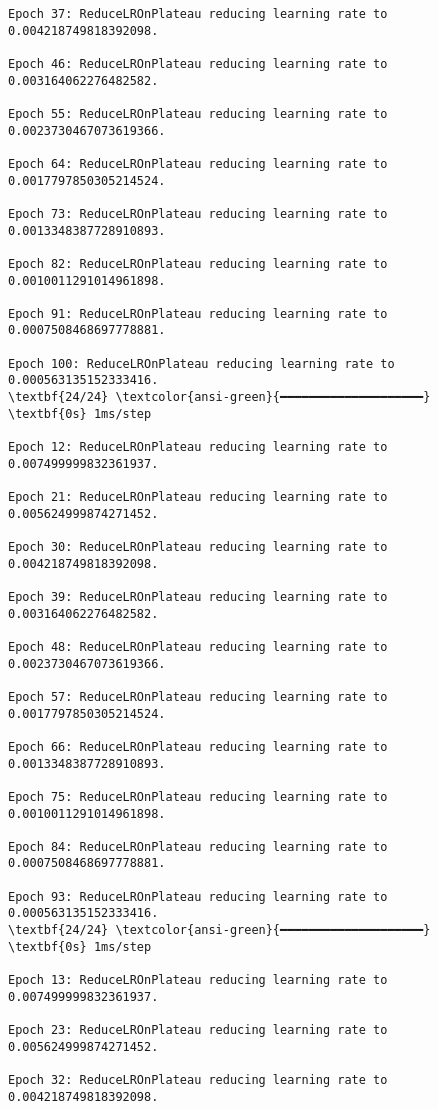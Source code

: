 \documentclass[11pt]{article}
\begin{document}
\begin{Verbatim}[commandchars=\\\{\}]
Epoch 37: ReduceLROnPlateau reducing learning rate to 0.004218749818392098.

Epoch 46: ReduceLROnPlateau reducing learning rate to 0.003164062276482582.

Epoch 55: ReduceLROnPlateau reducing learning rate to 0.0023730467073619366.

Epoch 64: ReduceLROnPlateau reducing learning rate to 0.0017797850305214524.

Epoch 73: ReduceLROnPlateau reducing learning rate to 0.0013348387728910893.

Epoch 82: ReduceLROnPlateau reducing learning rate to 0.0010011291014961898.

Epoch 91: ReduceLROnPlateau reducing learning rate to 0.0007508468697778881.

Epoch 100: ReduceLROnPlateau reducing learning rate to 0.000563135152333416.
\textbf{24/24} \textcolor{ansi-green}{━━━━━━━━━━━━━━━━━━━━} \textbf{0s} 1ms/step

Epoch 12: ReduceLROnPlateau reducing learning rate to 0.007499999832361937.

Epoch 21: ReduceLROnPlateau reducing learning rate to 0.005624999874271452.

Epoch 30: ReduceLROnPlateau reducing learning rate to 0.004218749818392098.

Epoch 39: ReduceLROnPlateau reducing learning rate to 0.003164062276482582.

Epoch 48: ReduceLROnPlateau reducing learning rate to 0.0023730467073619366.

Epoch 57: ReduceLROnPlateau reducing learning rate to 0.0017797850305214524.

Epoch 66: ReduceLROnPlateau reducing learning rate to 0.0013348387728910893.

Epoch 75: ReduceLROnPlateau reducing learning rate to 0.0010011291014961898.

Epoch 84: ReduceLROnPlateau reducing learning rate to 0.0007508468697778881.

Epoch 93: ReduceLROnPlateau reducing learning rate to 0.000563135152333416.
\textbf{24/24} \textcolor{ansi-green}{━━━━━━━━━━━━━━━━━━━━} \textbf{0s} 1ms/step

Epoch 13: ReduceLROnPlateau reducing learning rate to 0.007499999832361937.

Epoch 23: ReduceLROnPlateau reducing learning rate to 0.005624999874271452.

Epoch 32: ReduceLROnPlateau reducing learning rate to 0.004218749818392098.


\end{Verbatim}
\end{document}

